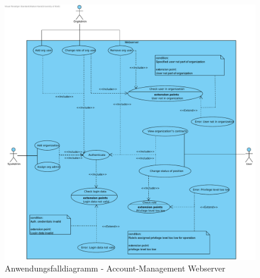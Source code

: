 \begin{figure}[h]
	\centering
	\includegraphics[width=\linewidth]{img/diagrams/Acc_Management_Web.pdf}
	\caption{Anwendungsfalldiagramm - Account-Management Webserver}
	\label{fig:anwendungsfalldiagramm-acc}
\end{figure}

\newpage

